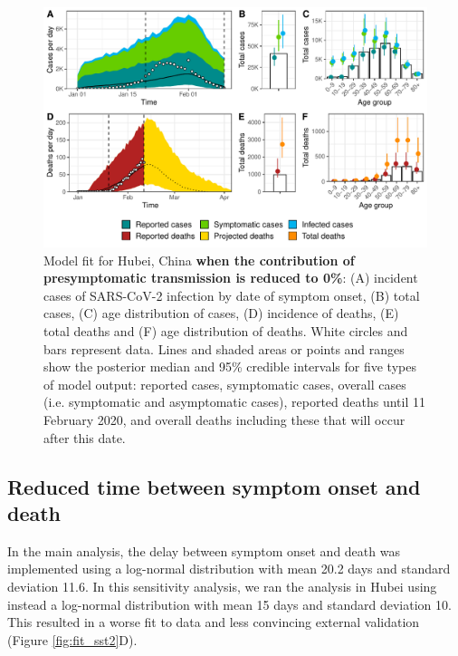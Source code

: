 \documentclass{article}
\begin{document}
\begin{figure}[H]
	\includegraphics[width=\linewidth]{../format_output/figures_v3/supp_fit_16H.pdf}
	\caption{Model fit for Hubei, China \textbf{when the contribution of presymptomatic transmission is reduced to 0\%}: (A) incident cases of SARS-CoV-2 infection by date of symptom onset, (B) total cases, (C) age distribution of cases, (D) incidence of deaths, (E) total deaths and (F) age distribution of deaths. White circles and bars represent data. Lines and shaded areas or points and ranges show the posterior median and 95\% credible intervals for five types of model output: reported cases, symptomatic cases, overall cases (i.e. symptomatic and asymptomatic cases), reported deaths until 11 February 2020, and overall deaths including these that will occur after this date.}\label{fig:sens_q0}
\end{figure}

\clearpage
\subsection{Reduced time between symptom onset and death}

In the main analysis, the delay between symptom onset and death was implemented using a log-normal distribution with mean 20.2 days and standard deviation 11.6. In this sensitivity analysis, we ran the analysis in Hubei using instead a log-normal distribution with mean 15 days and standard deviation 10. This resulted in a worse fit to data and less convincing external validation (Figure \ref{fig:fit_sst2}D).
\end{document}
